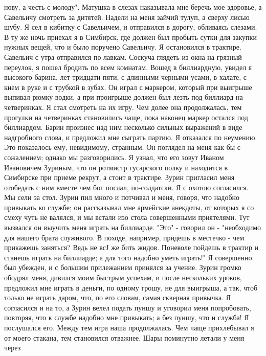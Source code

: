 нову,  а  честь  с  молоду".  Матушка  в  слезах наказывала мне  беречь  мое
здоровье, а Савельичу смотреть за  дитятей. Надели на  меня зайчий тулуп,  а
сверху лисью шубу.  Я сел в  кибитку  с Савельичем,  и  отправился в дорогу,
обливаясь слезами.
В  ту  же ночь приехал я в Симбирск,  где должен  был пробыть сутки для
закупки  нужных  вещей, что  и  было  поручено  Савельичу.  Я остановился  в
трактире.  Савельич с утра отправился по лавкам. Соскуча глядеть  из окна на
грязный переулок, я пошел  бродить  по  всем  комнатам. Вошед в биллиардную,
увидел  я высокого барина,  лет тридцати пяти, с  длинными черными усами,  в
халате, с кием в руке и с трубкой в зубах. Он играл с маркером, который  при
выигрыше выпивал рюмку  водки, а при проигрыше должен был лезть под биллиард
на  четверинках. Я стал смотреть на их игру. Чем долее она продолжалась, тем
прогулки  на четверинках становились чаще, пока наконец  маркер  остался под
биллиардом.  Барин  произнес над  ним  несколько  сильных выражений  в  виде
надгробного слова, и предложил мне  сыграть партию. Я отказался по неумению.
Это  показалось  ему,  невидимому,  странным. Он  поглядел  на меня как бы с
сожалением;  однако  мы  разговорились.  Я  узнал,  что   его  зовут  Иваном
Ивановичем Зуриным, что он ротмистр гусарского полку и находится в Симбирске
при  приеме рекрут, а стоит в трактире. Зурин пригласил меня отобедать с ним
вместе чем бог послал, по-солдатски. Я с охотою согласился. Мы сели за стол.
Зурин  пил много и потчивал и меня, говоря, что надобно привыкать ко службе;
он  рассказывал  мне  армейские  анекдоты,  от  которых я со смеху  чуть  не
валялся,  и мы  встали изо стола  совершенными  приятелями.  Тут вызвался он
выучить меня  играть  на биллиарде. "Это"  -  говорил он -  "необходимо  для
нашего  брата  служивого.  В  походе,  например, придешь  в  местечко  - чем
прикажешь заняться?  Ведь не всЈ же бить жидов. Поневоле пойдешь в трактир и
станешь играть на биллиарде; а для  того надобно уметь играть!" Я совершенно
был  убежден,  и  с большим  прилежанием принялся  за  учение.  Зурин громко
ободрял  меня,  дивился  моим  быстрым  успехам, и после  нескольких уроков,
предложил мне играть в деньги, по одному грошу, не для выигрыша, а так, чтоб
только  не играть даром,  что, по  его словам,  самая скверная  привычка.  Я
согласился и на то, а Зурин  велел подать пуншу и уговорил меня попробовать,
повторяя, что к службе  надобно  мне привыкать; а без пуншу, что и служба! Я
послушался его. Между тем игра наша продолжалась.  Чем чаще прихлебывал я от
моего стакана, тем становился  отважнее. Шары поминутно летали у  меня через
